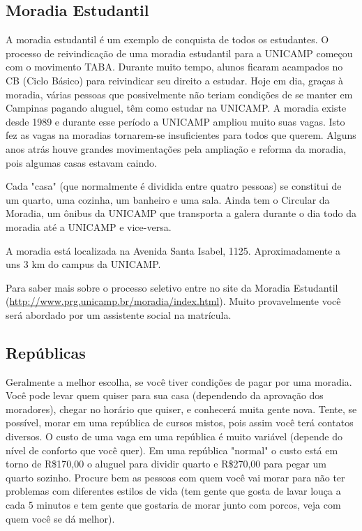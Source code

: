 \documentclass[a4paper,10pt]{article}
\begin{document}
\subsection{Moradia Estudantil}
A moradia estudantil é um exemplo de conquista de todos os estudantes.
O processo de reivindicação de uma moradia estudantil para a UNICAMP começou com
o movimento TABA. Durante muito tempo, alunos ficaram acampados no CB (Ciclo
Básico) para reivindicar seu direito a estudar. Hoje em dia, graças à moradia,
várias pessoas que possivelmente não teriam condições de se manter em Campinas
pagando aluguel, têm como estudar na UNICAMP. A moradia existe desde 1989
e durante esse período a UNICAMP ampliou muito suas vagas. Isto fez as vagas na
moradias tornarem-se insuficientes para todos que querem. Alguns anos atrás
houve grandes movimentações pela ampliação e reforma da moradia, pois algumas
casas estavam caindo. 

Cada "casa" (que normalmente é dividida entre quatro pessoas) se constitui de um
quarto, uma cozinha, um banheiro e uma sala. Ainda tem o Circular da Moradia, um
ônibus da UNICAMP que transporta a galera durante o dia todo da moradia até
a UNICAMP e vice-versa.

A moradia está localizada na Avenida Santa Isabel, 1125. Aproximadamente a uns
3 km do campus da UNICAMP.

Para saber mais sobre o processo seletivo entre no site da Moradia Estudantil
(\url{http://www.prg.unicamp.br/moradia/index.html}). Muito provavelmente você
será abordado por um assistente social na matrícula.

\subsection{Repúblicas}
Geralmente a melhor escolha, se você tiver condições de pagar por uma moradia.
Você pode levar quem quiser para sua casa (dependendo da aprovação dos
moradores), chegar no horário que quiser, e conhecerá muita gente nova. Tente,
se possível, morar em uma república de cursos mistos, pois assim você terá
contatos diversos. O custo de uma vaga em uma república é muito variável
(depende do nível de conforto que você quer). Em uma república "normal" o custo
está em torno de R\$170,00 o aluguel para dividir quarto e R\$270,00 para pegar
um quarto sozinho. Procure bem as pessoas com quem você vai morar para não ter
problemas com diferentes estilos de vida (tem gente que gosta de lavar louça
a cada 5 minutos e tem gente que gostaria de morar junto com porcos, veja com
quem você se dá melhor).
\end{document}
